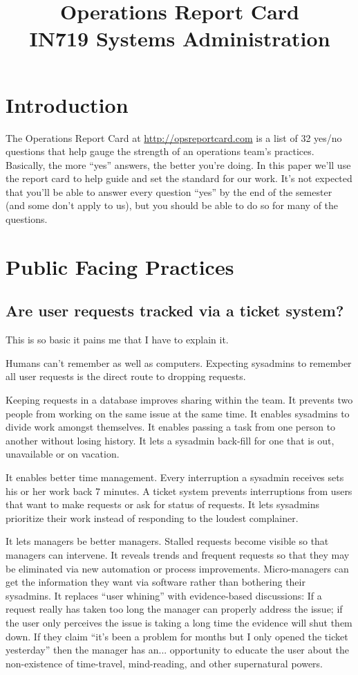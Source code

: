 \documentclass{article}
\begin{document}
\title{Operations Report Card \\ IN719 Systems Administration}
\date{}
\maketitle

\section*{Introduction}
The Operations Report Card at \url{http://opsreportcard.com} is a list of 32 yes/no questions that help gauge the strength of an operations team's practices. Basically, the more ``yes'' answers, the better you're doing. In this paper we'll use the report card to help guide and set the standard for our work. It's not expected that you'll be able to answer every question ``yes'' by the end of the semester (and some don't apply to us), but you should be able to do so for many of the questions.

\section{Public Facing Practices}

\subsection{Are user requests tracked via a ticket system?}
This is so basic it pains me that I have to explain it.

Humans can't remember as well as computers. Expecting sysadmins to remember all user requests is the direct route to dropping requests.

Keeping requests in a database improves sharing within the team. It prevents two people from working on the same issue at the same time. It enables sysadmins to divide work amongst themselves. It enables passing a task from one person to another without losing history. It lets a sysadmin back-fill for one that is out, unavailable or on vacation.

It enables better time management. Every interruption a sysadmin receives sets his or her work back 7 minutes. A ticket system prevents interruptions from users that want to make requests or ask for status of requests. It lets sysadmins prioritize their work instead of responding to the loudest complainer.

It lets managers be better managers. Stalled requests become visible so that managers can intervene. It reveals trends and frequent requests so that they may be eliminated via new automation or process improvements. Micro-managers can get the information they want via software rather than bothering their sysadmins. It replaces ``user whining'' with evidence-based discussions: If a request really has taken too long the manager can properly address the issue; if the user only perceives the issue is taking a long time the evidence will shut them down. If they claim ``it's been a problem for months but I only opened the ticket yesterday'' then the manager has an... opportunity to educate the user about the non-existence of time-travel, mind-reading, and other supernatural powers.
\end{document}
